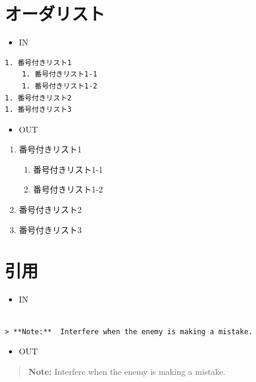 \documentclass[]{article}
\begin{document}
\section{オーダリスト}\label{header-n290}

\begin{itemize}
\item
  IN
\end{itemize}

\begin{verbatim}
1. 番号付きリスト1
    1. 番号付きリスト1-1
    1. 番号付きリスト1-2
1. 番号付きリスト2
1. 番号付きリスト3
\end{verbatim}

\begin{itemize}
\item
  OUT
\end{itemize}

\begin{enumerate}
\def\labelenumi{\arabic{enumi}.}
\item
  番号付きリスト1

  \begin{enumerate}
  \def\labelenumii{\arabic{enumii}.}
  \item
    番号付きリスト1-1
  \item
    番号付きリスト1-2
  \end{enumerate}
\item
  番号付きリスト2
\item
  番号付きリスト3
\end{enumerate}

\section{引用}\label{header-n310}

\begin{itemize}
\item
  IN
\end{itemize}

\begin{verbatim}

> **Note:**  Interfere when the enemy is making a mistake.
\end{verbatim}

\begin{itemize}
\item
  OUT
\end{itemize}

\begin{quote}
\textbf{Note:} Interfere when the enemy is making a mistake.
\end{quote}
\end{document}
